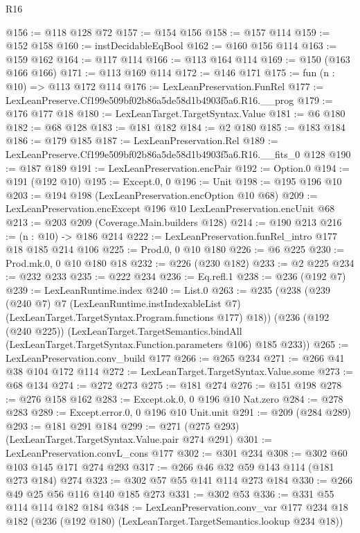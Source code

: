 \begin{lexlean}{R16}
\begin{coremodule}
@156 := @118 @128 @72
@157 := @154 @156
@158 := @157 @114
@159 := @152 @158
@160 := instDecidableEqBool
@162 := @160 @156 @114
@163 := @159 @162
@164 := @117 @114
@166 := @113 @164 @114
@169 := @150 (@163 @166 @166)
@171 := @113 @169 @114
@172 := @146 @171
@175 := fun (n : @10) => @113 @172 @114
@176 := LexLeanPreservation.FunRel
@177 := LexLeanPreserve.Cf199e509bf02b86a5de58d1b4903f5a6.R16.__prog
@179 := @176 @177 @18
@180 := LexLeanTarget.TargetSyntax.Value
@181 := @6 @180
@182 := @68 @128
@183 := @181 @182
@184 := @2 @180
@185 := @183 @184
@186 := @179 @185
@187 := LexLeanPreservation.Rel
@189 := LexLeanPreserve.Cf199e509bf02b86a5de58d1b4903f5a6.R16.__fits_0 @128
@190 := @187 @189
@191 := LexLeanPreservation.encPair
@192 := Option.{0}
@194 := @191 (@192 @10)
@195 := Except.{0, 0}
@196 := Unit
@198 := @195 @196 @10
@203 := @194 @198 (LexLeanPreservation.encOption @10 @68)
@209 := LexLeanPreservation.encExcept @196 @10 LexLeanPreservation.encUnit @68
@213 := @203 @209 (Coverage.Main.builders @128)
@214 := @190 @213
@216 := (n : @10) -> @186 @214
@222 := LexLeanPreservation.funRel_intro @177 @18 @185 @214 @106
@225 := Prod.{0, 0} @10 @180
@226 := @6 @225
@230 := Prod.mk.{0, 0} @10 @180 @18
@232 := @226 (@230 @182)
@233 := @2 @225
@234 := @232 @233
@235 := @222 @234
@236 := Eq.refl.{1}
@238 := @236 (@192 @7)
@239 := LexLeanRuntime.index
@240 := List.{0}
@263 := @235
    (@238
      (@239
        (@240 @7)
        @7
        (LexLeanRuntime.instIndexableList @7)
        (LexLeanTarget.TargetSyntax.Program.functions @177)
        @18))
    (@236
      (@192 (@240 @225))
      (LexLeanTarget.TargetSemantics.bindAll
        (LexLeanTarget.TargetSyntax.Function.parameters @106)
        @185
        @233))
@265 := LexLeanPreservation.conv_build @177
@266 := @265 @234
@271 := @266 @41 @38 @104 @172 @114
@272 := LexLeanTarget.TargetSyntax.Value.some
@273 := @68 @134
@274 := @272 @273
@275 := @181 @274
@276 := @151 @198
@278 := @276 @158 @162
@283 := Except.ok.{0, 0} @196 @10 Nat.zero
@284 := @278 @283
@289 := Except.error.{0, 0} @196 @10 Unit.unit
@291 := @209 (@284 @289)
@293 := @181 @291 @184
@299 := @271 (@275 @293) (LexLeanTarget.TargetSyntax.Value.pair @274 @291)
@301 := LexLeanPreservation.convL_cons @177
@302 := @301 @234
@308 := @302 @60 @103 @145 @171 @274 @293
@317 := @266 @46 @32 @59 @143 @114 (@181 @273 @184) @274
@323 := @302 @57 @55 @141 @114 @273 @184
@330 := @266 @49 @25 @56 @116 @140 @185 @273
@331 := @302 @53
@336 := @331 @55 @114 @114 @182 @184
@348 := LexLeanPreservation.conv_var
    @177
    @234
    @18
    @182
    (@236 (@192 @180) (LexLeanTarget.TargetSemantics.lookup @234 @18))

\end{coremodule}
\end{lexlean}
